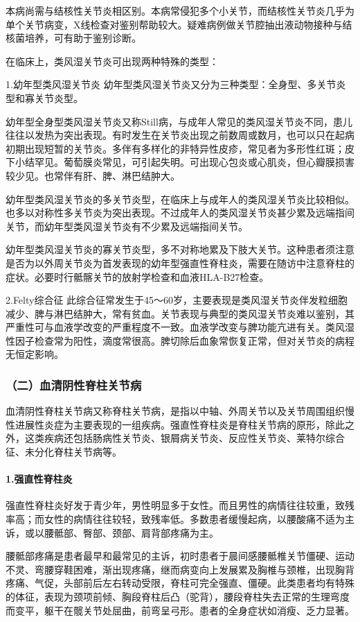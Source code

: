 本病尚需与结核性关节炎相区别。本病常侵犯多个小关节，而结核性关节炎几乎为单个关节病变，X线检查对鉴别帮助较大。疑难病例做关节腔抽出液动物接种与结核菌培养，可有助于鉴别诊断。

在临床上，类风湿关节炎可出现两种特殊的类型：

1.幼年型类风湿关节炎
幼年型类风湿关节炎又分为三种类型：全身型、多关节炎型和寡关节炎型。

幼年型全身型类风湿关节炎又称Still病，与成年人常见的类风湿关节炎不同，患儿往往以发热为突出表现。有时发生在关节炎出现之前数周或数月，也可以只在起病初期出现短暂的关节炎。多伴有多样化的非特异性皮疹，常见者为多形性红斑；皮下小结罕见。葡萄膜炎常见，可引起失明。可出现心包炎或心肌炎，但心瓣膜损害较少见。也常伴有肝、脾、淋巴结肿大。

幼年型类风湿关节炎的多关节炎型，在临床上与成年人的类风湿关节炎比较相似。也多以对称性多关节炎为突出表现。不过成年人的类风湿关节炎甚少累及远端指间关节，而幼年型类风湿关节炎有不少累及远端指间关节。

幼年型类风湿关节炎的寡关节炎型，多不对称地累及下肢大关节。这种患者须注意是否为以外周关节炎为首发表现的幼年型强直性脊柱炎，需要在随访中注意脊柱的症状。必要时行骶髂关节的放射学检查和血液HLA-B27检查。

2.Felty综合征
此综合征常发生于45～60岁，主要表现是类风湿关节炎伴发粒细胞减少、脾与淋巴结肿大，常有贫血。关节表现与典型的类风湿关节炎难以鉴别，其严重性可与血液学改变的严重程度不一致。血液学改变与脾功能亢进有关。类风湿性因子检查常为阳性，滴度常很高。脾切除后血象常恢复正常，但对关节炎的病程无恒定影响。

\subsubsection{（二）血清阴性脊柱关节病}

血清阴性脊柱关节病又称脊柱关节病，是指以中轴、外周关节以及关节周围组织慢性进展性炎症为主要表现的一组疾病。强直性脊柱炎是脊柱关节病的原形，除此之外，这类疾病还包括肠病性关节炎、银屑病关节炎、反应性关节炎、莱特尔综合征、未分化脊柱关节病等。

\paragraph{1.强直性脊柱炎}

强直性脊柱炎好发于青少年，男性明显多于女性。而且男性的病情往往较重，致残率高；而女性的病情往往较轻，致残率低。多数患者缓慢起病，以腰酸痛不适为主诉，或以腰骶部、臀部、颈部、肩背部疼痛为主。

腰骶部疼痛是患者最早和最常见的主诉，初时患者于晨间感腰骶椎关节僵硬、运动不灵、弯腰穿鞋困难，渐出现疼痛，继而病变向上发展累及胸椎与颈椎，出现胸背疼痛、气促，头部前后左右转动受限，脊柱可完全强直、僵硬。此类患者均有特殊的体征，表现为颈项前倾、胸段脊柱后凸（驼背），腰段脊柱失去正常的生理弯度而变平，躯干在髋关节处屈曲，前弯呈弓形。患者的全身症状如消瘦、乏力显著。

